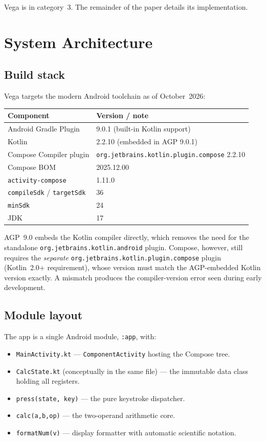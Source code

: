 \documentclass[11pt,a4paper]{article}
\begin{document}
Vega is in category~3. The remainder of the paper details its implementation.

\section{System Architecture}

\subsection{Build stack}

Vega targets the modern Android toolchain as of October~2026:

\begin{center}
\begin{tabular}{@{}ll@{}}
\toprule
Component & Version / note \\
\midrule
Android Gradle Plugin & 9.0.1 (built-in Kotlin support) \\
Kotlin & 2.2.10 (embedded in AGP 9.0.1) \\
Compose Compiler plugin & \texttt{org.jetbrains.kotlin.plugin.compose} 2.2.10 \\
Compose BOM & 2025.12.00 \\
\texttt{activity-compose} & 1.11.0 \\
\texttt{compileSdk} / \texttt{targetSdk} & 36 \\
\texttt{minSdk} & 24 \\
JDK & 17 \\
\bottomrule
\end{tabular}
\end{center}

AGP~9.0 embeds the Kotlin compiler directly, which removes the need for the standalone \texttt{org.jetbrains.kotlin.android} plugin. Compose, however, still requires the \emph{separate} \texttt{org.jetbrains.kotlin.plugin.compose} plugin (Kotlin~2.0+ requirement), whose version must match the AGP-embedded Kotlin version exactly. A mismatch produces the compiler-version error seen during early development.

\subsection{Module layout}

The app is a single Android module, \texttt{:app}, with:
\begin{itemize}[leftmargin=*,itemsep=0pt]
    \item \texttt{MainActivity.kt} --- \texttt{ComponentActivity} hosting the Compose tree.
    \item \texttt{CalcState.kt} (conceptually in the same file) --- the immutable data class holding all registers.
    \item \texttt{press(state, key)} --- the pure keystroke dispatcher.
    \item \texttt{calc(a,b,op)} --- the two-operand arithmetic core.
    \item \texttt{formatNum(v)} --- display formatter with automatic scientific notation.
\end{itemize}
\end{document}
